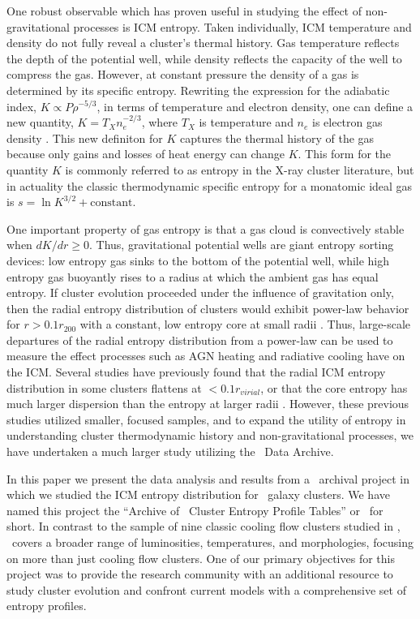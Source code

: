 \documentclass{emulateapj}
\begin{document}
One robust observable which has proven useful in studying the effect
of non-gravitational processes is ICM entropy. Taken individually, ICM
temperature and density do not fully reveal a cluster's thermal
history. Gas temperature reflects the depth of the potential well,
while density reflects the capacity of the well to compress the
gas. However, at constant pressure the density of a gas is determined
by its specific entropy. Rewriting the expression for the adiabatic
index, $K \propto P\rho^{-5/3}$, in terms of temperature and electron
density, one can define a new quantity, $K=T_X n_e^{-2/3}$, where
$T_X$ is temperature and $n_e$ is electron gas density
\citep{1999Natur.397..135P, davies00}. This new definiton for $K$
captures the thermal history of the gas because only gains and losses
of heat energy can change $K$. This form for the quantity $K$ is
commonly referred to as entropy in the X-ray cluster literature, but
in actuality the classic thermodynamic specific entropy for a
monatomic ideal gas is $s = \ln K^{3/2} + \mathrm{constant}$.

One important property of gas entropy is that a gas cloud is
convectively stable when $dK/dr \geq 0$. Thus, gravitational potential
wells are giant entropy sorting devices: low entropy gas sinks to the
bottom of the potential well, while high entropy gas buoyantly rises
to a radius at which the ambient gas has equal entropy. If cluster
evolution proceeded under the influence of gravitation only, then the
radial entropy distribution of clusters would exhibit power-law
behavior for $r > 0.1 r_{200}$ with a constant, low entropy core at
small radii \citep{vkb05}. Thus, large-scale departures of the radial
entropy distribution from a power-law can be used to measure the
effect processes such as AGN heating and radiative cooling have on the
ICM. Several studies have previously found that the radial ICM entropy
distribution in some clusters flattens at $< 0.1 r_{virial}$, or that
the core entropy has much larger dispersion than the entropy at larger
radii \citep{1996ApJ...473..692D, 1999Natur.397..135P, davies00,
ponman03, piffaretti05, radioquiet, d06, morandi07}. However, these
previous studies utilized smaller, focused samples, and to expand the
utility of entropy in understanding cluster thermodynamic history and
non-gravitational processes, we have undertaken a much larger study
utilizing the \chandra\ Data Archive.

In this paper we present the data analysis and results from a
\chandra\ archival project in which we studied the ICM entropy
distribution for \numcluster\ galaxy clusters. We have named this
project the ``Archive of \chandra\ Cluster Entropy Profile Tables'' or
\accept\ for short. In contrast to the sample of nine classic cooling
flow clusters studied in \citet[][hereafter D06]{d06}, \accept\ covers
a broader range of luminosities, temperatures, and morphologies,
focusing on more than just cooling flow clusters. One of our primary
objectives for this project was to provide the research community with
an additional resource to study cluster evolution and confront current
models with a comprehensive set of entropy profiles.
\end{document}
